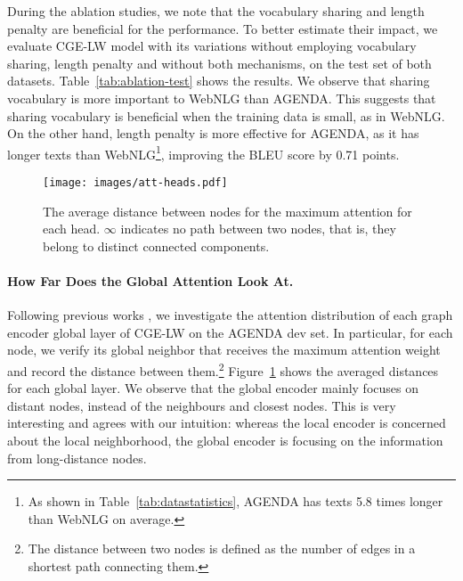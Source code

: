 \documentclass[11pt,a4paper]{article}
\begin{document}
During the ablation studies, we note that the vocabulary sharing and length penalty are beneficial for the performance. To better estimate their impact, we evaluate {\selectfont CGE-LW} model with its variations without employing vocabulary sharing, length penalty and without both mechanisms, on the test set of both datasets. Table~\ref{tab:ablation-test} shows the results. We observe that sharing vocabulary is more important to WebNLG than AGENDA. This suggests that sharing vocabulary is beneficial when the training data is small, as in WebNLG. On the other hand, length penalty is more effective for AGENDA, as it has longer texts than WebNLG\footnote{As shown in Table~\ref{tab:datastatistics}, AGENDA has texts 5.8 times longer than WebNLG on average.}, improving the BLEU score by 0.71 points.

 \begin{figure}[t]
    \centering
    \texttt{[image: images/att-heads.pdf]}
    \vspace{-4mm}
    \caption{The average distance between nodes for the maximum attention for each head. $\infty$ indicates no path between two nodes, that is, they belong to distinct connected components.}
    \label{fig:attns}
    \vspace{-4mm}
\end{figure}
\paragraph{How Far Does the Global Attention Look At.}

Following previous works \cite{voita-etal-2019-analyzing, cai-lam-2020-graph}, we investigate the attention distribution of each graph encoder global layer of {\selectfont CGE-LW} on the AGENDA dev set. In particular, for each node, we verify its global neighbor that receives the maximum attention weight and record the distance between them.\footnote{The distance between two nodes is defined as the number of edges in a shortest path connecting them.} Figure~\ref{fig:attns} shows the averaged distances for each global layer. We observe that the global encoder mainly focuses on distant nodes, instead of the neighbours and closest nodes. This is very interesting and agrees with our intuition: whereas the local encoder is concerned about the local neighborhood, the global encoder is focusing on the information from long-distance nodes.
\vspace{-2mm}
\end{document}
